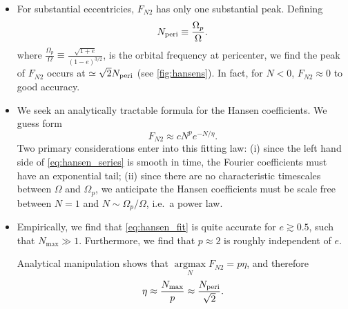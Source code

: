 \documentclass[
        fleqn,
        usenatbib,
        referee,
    ]{mnras}
\newcommand*{\p}[1]{\left(#1\right)}
\DeclareMathOperator*{\argmax}{argmax}
\begin{document}
\begin{itemize}
    \item For substantial eccentricies, $F_{N2}$ has only one substantial peak.
        Defining
        \begin{equation}
            N_{\rm peri} \equiv \frac{\Omega_p}{\Omega}.
        \end{equation}
        where $\frac{\Omega_p}{\Omega} \equiv \frac{\sqrt{1 + e}}{\p{1 -
        e}^{3/2}}$, is the orbital frequency at pericenter, we find the peak of
        $F_{N2}$ occurs at $\simeq \sqrt{2}N_{\rm peri}$ (see
        \autoref{fig:hansens}). In fact, for $N < 0$, $F_{N2} \approx 0$ to good
        accuracy.

    \item We seek an analytically tractable formula for the Hansen coefficients.
        We guess form
        \begin{equation}
            F_{N2} \approx cN^{p}e^{-N/\eta}.\label{eq:hansen_fit}
        \end{equation}
        Two primary considerations enter into this fitting law: (i) since the
        left hand side of \autoref{eq:hansen_series} is smooth in time, the
        Fourier coefficients must have an exponential tail; (ii) since there are
        no characteristic timescales between $\Omega$ and $\Omega_p$, we
        anticipate the Hansen coefficients must be scale free between $N = 1$
        and $N \sim \Omega_p / \Omega$, i.e.\ a power law.

    \item Empirically, we find that \autoref{eq:hansen_fit} is quite accurate
        for $e \gtrsim 0.5$, such that $N_{\max} \gg 1$. Furthermore, we find
        that $p \approx 2$ is roughly independent of $e$.

        Analytical manipulation shows that $\argmax\limits_N F_{N2} = p\eta$,
        and therefore
        \begin{equation}
            \eta \approx \frac{N_{\max}}{p} \approx \frac{N_{\rm
                peri}}{\sqrt{2}}. \label{eq:a_approx}
        \end{equation}


\end{itemize}
\end{document}
